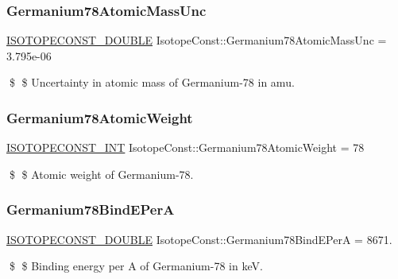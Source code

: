 \subsubsection{\texorpdfstring{Germanium78\+Atomic\+Mass\+Unc}{Germanium78AtomicMassUnc}}
{\footnotesize\ttfamily \mbox{\hyperlink{group___isotope_const-_macros_ga8f45a7272ce02c0b4c65c44636ed719a}{I\+S\+O\+T\+O\+P\+E\+C\+O\+N\+S\+T\+\_\+\+D\+O\+U\+B\+LE}} Isotope\+Const\+::\+Germanium78\+Atomic\+Mass\+Unc = 3.\+795e-\/06}

\$ \$ Uncertainty in atomic mass of Germanium-\/78 in amu. \mbox{\label{group___isotope_const-_germanium-_ge78_ga13a3055108555fbe22ee98f13b83ce77}} 
\subsubsection{\texorpdfstring{Germanium78\+Atomic\+Weight}{Germanium78AtomicWeight}}
{\footnotesize\ttfamily \mbox{\hyperlink{group___isotope_const-_macros_ga5f18360b3e99483a35c32d789e62621c}{I\+S\+O\+T\+O\+P\+E\+C\+O\+N\+S\+T\+\_\+\+I\+NT}} Isotope\+Const\+::\+Germanium78\+Atomic\+Weight = 78}

\$ \$ Atomic weight of Germanium-\/78. \mbox{\label{group___isotope_const-_germanium-_ge78_gad7ae141a7c3f39e4d08d2afcd2ab88a3}} 
\subsubsection{\texorpdfstring{Germanium78\+Bind\+E\+PerA}{Germanium78BindEPerA}}
{\footnotesize\ttfamily \mbox{\hyperlink{group___isotope_const-_macros_ga8f45a7272ce02c0b4c65c44636ed719a}{I\+S\+O\+T\+O\+P\+E\+C\+O\+N\+S\+T\+\_\+\+D\+O\+U\+B\+LE}} Isotope\+Const\+::\+Germanium78\+Bind\+E\+PerA = 8671.}

\$ \$ Binding energy per A of Germanium-\/78 in keV. \mbox{\label{group___isotope_const-_germanium-_ge78_ga9b0e324090043717c64264d501b0acd5}} 
